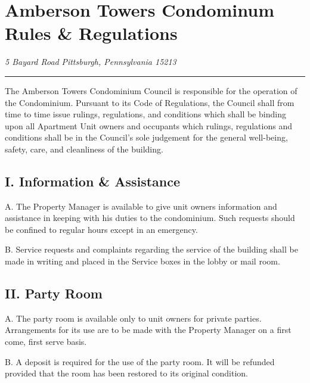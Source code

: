 \documentclass[
]{book}
\begin{document}
\hypertarget{amberson-towers-condominum-rules-regulations}{%
\chapter{\texorpdfstring{Amberson Towers Condominum Rules \& Regulations}{Amberson Towers Condominum   Rules \& Regulations}}\label{amberson-towers-condominum-rules-regulations}}

\emph{5 Bayard Road}
\emph{Pittsburgh, Pennsylvania 15213}

\begin{center}\rule{0.5\linewidth}{0.5pt}\end{center}

The Amberson Towers Condominium Council is responsible for the operation of the Condominium. Pursuant to its Code of Regulations, the Council shall from time to time issue rulings, regulations, and conditions which shall be binding upon all Apartment Unit owners and occupants which rulings, regulations and conditions shall be in the Council's sole judgement for the general well-being, safety, care, and cleanliness of the building.

\hypertarget{i.-information-assistance}{%
\section*{I. Information \& Assistance}\label{i.-information-assistance}}

A. The Property Manager is available to give unit owners information and assistance in keeping with his duties to the condominium. Such requests should be confined to regular hours except in an emergency.

B. Service requests and complaints regarding the service of the building shall be made in writing and placed in the Service boxes in the lobby or mail room.

\hypertarget{ii.-party-room}{%
\section*{II. Party Room}\label{ii.-party-room}}

A. The party room is available only to unit owners for private parties. Arrangements for its use are to be made with the Property Manager on a first come, first serve basis.

B. A deposit is required for the use of the party room. It will be refunded provided that the room has been restored to its original condition.
\end{document}

